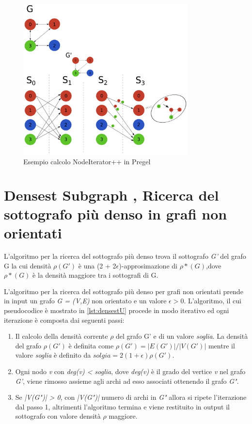 \documentclass[LaM,binding=0.6cm]{sapthesis}
\begin{document}
\begin{figure}
\centering
 \includegraphics[width=0.8\textwidth]{pregel-trianglepp}
\caption{Esempio calcolo NodeIterator++ in Pregel}
\label{fig:PREGELNIT}
\end{figure}

\section{Densest Subgraph , Ricerca del sottografo più denso in grafi non orientati}

L'algoritmo per la ricerca del sottografo più denso \cite{Bahmani:2012:DSS:2140436.2140442} trova il sottografo \textit{G'} del grafo G la cui densità $\rho(G')$ è una  (2 + 2$\epsilon$)-approsimazione di $\rho*(G)$,dove $\rho*(G)$ è la densità maggiore tra i sottografi di G.

L'algoritmo per la  ricerca del sottografo più denso per grafi non orientati prende in input un grafo \textit{G = (V,E)} non orientato e un valore \textit{$\epsilon > 0$}.
L'algoritmo, il cui pseudocodice è mostrato in \ref{lst:densestU} procede in modo iterativo ed ogni iterazione è composta dai seguenti passi:
\begin{enumerate}
\item Il calcolo della densità corrente $\rho$ del grafo G' e di un valore \textit{soglia}. La densità del grafo $\rho(G')$ è definita come \textit{$\rho(G') = |E(G')| / |V(G')|$} mentre il  valore \textit{soglia}  è definito da \textit{$solgia = 2 (1 + \epsilon) \rho(G') $}.

\item Ogni nodo \textit{v} con \textit{deg(v) < soglia}, dove \textit{deg(v)} è il grado del vertice \textit{v} nel grafo \textit{G'}, viene rimosso assieme agli archi ad esso associati ottenendo il grafo \textit{G"}.
\item Se \textit{ |V(G")| > 0}, con \textit{|V(G")|} numero di archi in \textit{G"} allora si ripete l'iterazione dal passo 1, altrimenti l'algoritmo termina e viene restituito in output il sottografo con valore densità $\rho$ maggiore.

\end{enumerate}
\end{document}
